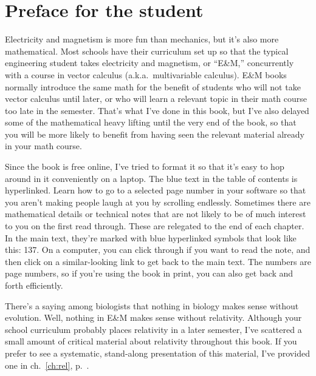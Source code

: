 \chapter{Preface for the student}%

Electricity and magnetism is more fun than mechanics, but it's
also more mathematical. Most schools have their curriculum set up
so that the typical engineering student takes electricity and magnetism,
or ``E\&M,'' concurrently with a course in vector calculus (a.k.a.~multivariable
calculus). E\&M books normally introduce the same math for the benefit of
students who will not take vector calculus until later, or who will learn
a relevant topic in their math course too late in the semester. That's
what I've done in this book, but I've also delayed some of the mathematical
heavy lifting until the very end of the book, so that you will be more likely to
benefit from having seen the relevant material already in your math
course.

Since the book is free online, I've tried to format it so that it's
easy to hop around in it conveniently on a laptop. The blue text in the
table of contents is hyperlinked. Learn how to go to a selected page number
in your software so that you aren't making people laugh at you by scrolling
endlessly. Sometimes there are mathematical details or technical notes that
are not likely to be of much interest to you on the first read through.
These are relegated to the end of each chapter. In the main text, they're
marked with blue hyperlinked symbols that look like this: 
\dangerousbend{}137. On a computer, you can click through if you want to
read the note, and then click on a similar-looking link to get back to
the main text. The numbers are page numbers, so if you're using the book in print,
you can also get back and forth efficiently.

There's a saying among biologists that nothing in biology makes sense without
evolution. Well, nothing in E\&M makes sense without relativity. Although
your school curriculum probably places relativity in a later semester, I've
scattered a small amount of critical material about relativity throughout
this book. If you prefer to see a systematic, stand-along presentation of
this material, I've provided one in ch.~\ref{ch:rel}, p.~\pageref{ch:rel}.
